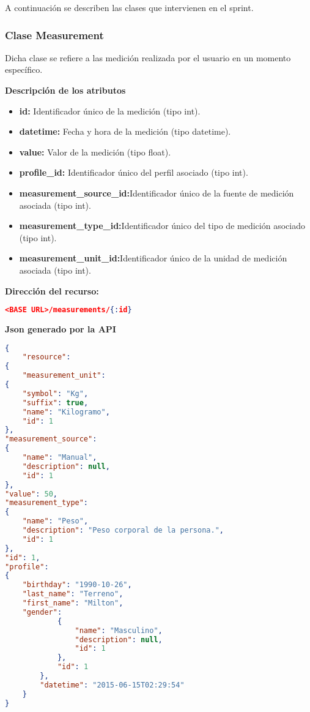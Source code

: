 A continuación se describen las clases que intervienen en el sprint.

\subsubsection{Clase Measurement} 
Dicha clase se refiere a las medición realizada por el usuario en un momento específico. 

\textbf{Descripción de los atributos}
	\begin{itemize}
		\item \textbf{id:} Identificador único de la medición (tipo int).
        \item \textbf{datetime:} Fecha y hora de la medición (tipo datetime).
        \item \textbf{value:} Valor de la medición (tipo float).
        \item \textbf{profile\_id:} Identificador único del perfil asociado (tipo int).
        \item \textbf{measurement\_source\_id:}Identificador único de la fuente de medición asociada (tipo int).
        \item \textbf{measurement\_type\_id:}Identificador único del tipo de medición asociado (tipo int).
        \item \textbf{measurement\_unit\_id:}Identificador único de la unidad de medición asociada (tipo int).
        
	\end{itemize}
    
\textbf{Dirección del recurso:}
\begin{lstlisting}[language=json,firstnumber=1]
<BASE URL>/measurements/{:id}
\end{lstlisting}

\textbf{Json generado por la API}    
\begin{lstlisting}[language=json,firstnumber=1]
{
    "resource": 
{
    "measurement_unit": 
{
    "symbol": "Kg",
    "suffix": true,
    "name": "Kilogramo",
    "id": 1
},
"measurement_source": 
{
    "name": "Manual",
    "description": null,
    "id": 1
},
"value": 50,
"measurement_type": 
{
    "name": "Peso",
    "description": "Peso corporal de la persona.",
    "id": 1
},
"id": 1,
"profile": 
{
    "birthday": "1990-10-26",
    "last_name": "Terreno",
    "first_name": "Milton",
    "gender": 
            {
                "name": "Masculino",
                "description": null,
                "id": 1
            },
            "id": 1
        },
        "datetime": "2015-06-15T02:29:54"
    }
}
\end{lstlisting}
